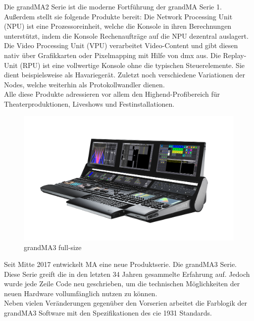 \documentclass[11pt]{scrartcl}
\begin{document}
\noindent
Die grandMA2 Serie ist die moderne Fortführung der grandMA Serie 1. Außerdem stellt sie
folgende Produkte bereit: Die Network Processing Unit (NPU) ist eine Prozessoreinheit, welche die
Konsole in ihren Berechnungen unterstützt, indem die Konsole Rechenaufträge auf die NPU dezentral
auslagert. Die Video Processing Unit (VPU) verarbeitet Video-Content und gibt diesen nativ über
Grafikkarten oder Pixelmapping mit Hilfe von \ac{dmx} aus. Die Replay-Unit (RPU) ist eine vollwertige
Konsole ohne die typischen Steuerelemente. Sie dient beispielsweise als Havariegerät. Zuletzt noch
verschiedene Variationen der Nodes, welche weiterhin als Protokollwandler dienen.\\
Alle diese Produkte adressieren vor allem den Highend-Profibereich für Theaterproduktionen,
Liveshows und Festinstallationen.\\
\begin{figure}[H]
    \includegraphics[width=\textwidth]{images/grandMA3-full-size.png}
    \caption{grandMA3 full-size \cite{gma3}}\label{fig:gma3}
\end{figure}
\noindent
Seit Mitte 2017 entwickelt MA eine neue Produktserie. Die grandMA3 Serie. Diese Serie greift die
in den letzten 34 Jahren gesammelte Erfahrung auf. Jedoch wurde jede Zeile Code neu geschrieben,
um die technischen Möglichkeiten der neuen Hardware vollumfänglich nutzen zu können.\\
Neben vielen Veränderungen gegenüber den Vorserien arbeitet die Farblogik der grandMA3 Software
mit den Spezifikationen des \ac{cie} 1931 Standards.
\clearpage

\end{document}
